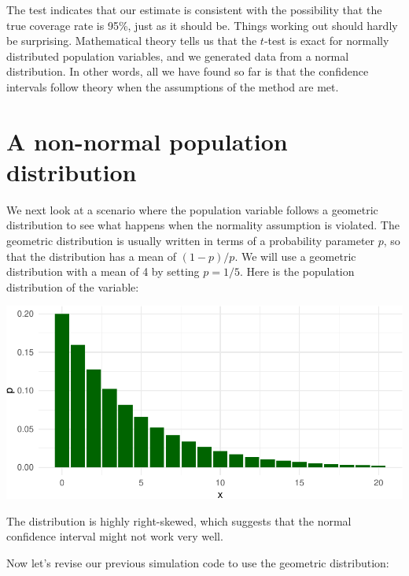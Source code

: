 \documentclass[
]{book}
\newenvironment{Shaded}{\begin{snugshade}}{\end{snugshade}}
\newcommand{\AttributeTok}[1]{\textcolor[rgb]{0.13,0.29,0.53}{#1}}
\newcommand{\DecValTok}[1]{\textcolor[rgb]{0.00,0.00,0.81}{#1}}
\newcommand{\FunctionTok}[1]{\textcolor[rgb]{0.13,0.29,0.53}{\textbf{#1}}}
\newcommand{\NormalTok}[1]{#1}
\newcommand{\OtherTok}[1]{\textcolor[rgb]{0.56,0.35,0.01}{#1}}
\newcommand{\SpecialCharTok}[1]{\textcolor[rgb]{0.81,0.36,0.00}{\textbf{#1}}}
\begin{document}
The test indicates that our estimate is consistent with the possibility that the true coverage rate is 95\%, just as it should be.
Things working out should hardly be surprising.
Mathematical theory tells us that the \(t\)-test is exact for normally distributed population variables, and we generated data from a normal distribution.
In other words, all we have found so far is that the confidence intervals follow theory when the assumptions of the method are met.

\section{A non-normal population distribution}\label{a-non-normal-population-distribution}

We next look at a scenario where the population variable follows a geometric distribution to see what happens when the normality assumption is violated.
The geometric distribution is usually written in terms of a probability parameter \(p\), so that the distribution has a mean of \((1 - p) / p\).
We will use a geometric distribution with a mean of 4 by setting \(p = 1/5\).
Here is the population distribution of the variable:

\begin{center}\includegraphics[width=0.75\linewidth]{Designing-Simulations-in-R_files/figure-latex/unnamed-chunk-34-1} \end{center}

The distribution is highly right-skewed, which suggests that the normal confidence interval might not work very well.

Now let's revise our previous simulation code to use the geometric distribution:

\begin{Shaded}
\end{Shaded}
\end{document}
